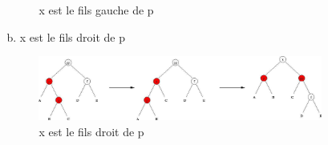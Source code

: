 \begin{itemize}
\begin{enumerate}
\begin{enumerate}
\begin{figure}[H]
	\caption{x est le fils gauche de p}
\end{figure}
					\item[b.] x est le fils droit de p 
\begin{figure}[H]
	\centering
	\includegraphics[width=12.5cm]{content/schemas/arbreRNcas2b.png}
	\caption{x est le fils droit de p}
\end{figure}
				\end{enumerate}
		\end{enumerate}
\end{itemize}


